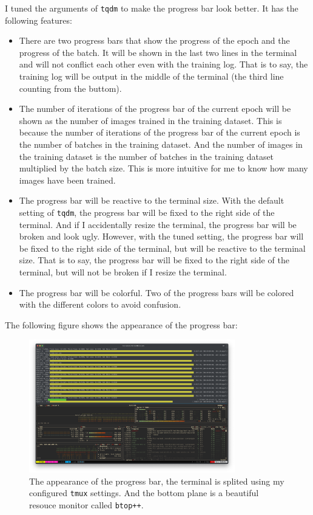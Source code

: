 I tuned the arguments of \texttt{tqdm} to make the progress bar look better.
It has the following features:
\begin{itemize}
    \item There are two progress bars that show the progress of the epoch and the progress of the batch.
          It will be shown in the last two lines in the terminal and will not conflict each other even with the training log.
          That is to say, the training log will be output in the middle of the terminal (the third line counting from the buttom).
    \item The number of iterations of the progress bar of the current epoch will be shown as the number of images trained in the training dataset.
          This is because the number of iterations of the progress bar of the current epoch is the number of batches in the training dataset.
          And the number of images in the training dataset is the number of batches in the training dataset multiplied by the batch size.
          This is more intuitive for me to know how many images have been trained.
    \item The progress bar will be reactive to the terminal size.
          With the default setting of \texttt{tqdm}, the progress bar will be fixed to the right side of the terminal.
          And if I accidentally resize the terminal, the progress bar will be broken and look ugly.
          However, with the tuned setting, the progress bar will be fixed to the right side of the terminal, but will be reactive to the terminal size.
          That is to say, the progress bar will be fixed to the right side of the terminal, but will not be broken if I resize the terminal.
    \item The progress bar will be colorful. Two of the progress bars will be colored with the different colors to avoid confusion.
\end{itemize}


The following figure shows the appearance of the progress bar:
\begin{figure}[H]
    \centering
    \includegraphics[width=0.8\textwidth]{./images/tqdm.png}
    \caption{The appearance of the progress bar, the terminal is splited using my configured \texttt{tmux} settings. And the bottom plane is a beautiful resouce monitor called \texttt{btop++}.}
    \label{fig:tqdm}
\end{figure}

